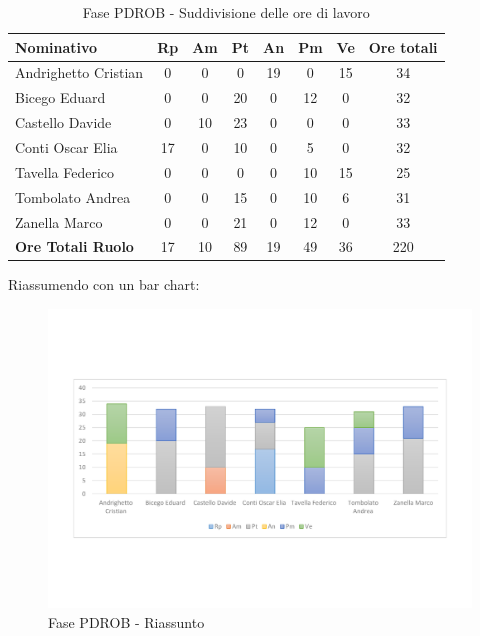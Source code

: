 \documentclass[../PianoProgetto.tex]{subfiles}
\begin{document}
	\begin{table}[h]
	
		\begin{tabularx}{\textwidth}{l  * {6}{C}  c}
			\toprule
			\textbf{Nominativo} & \textbf{Rp} & \textbf{Am} & \textbf{Pt} 
						& \textbf{An} & \textbf{Pm} & \textbf{Ve} & \textbf{Ore totali} \\
			\midrule
			Andrighetto Cristian & 0 &	0 &	0 &	19 & 0 & 15 & 34 \\
			Bicego Eduard & 0 &	0 &	20 & 0 & 12 & 0 & 32 \\
			Castello Davide & 0 & 10 & 23 &	0 &	0 &	0 &	33 \\
			Conti Oscar Elia & 17 &	0 &	10 & 0 & 5 & 0 & 32 \\
			Tavella Federico &	0 &	0 &	0 &	0 &	10 & 15 & 25 \\
			Tombolato Andrea & 0 & 0 &	15 & 0 & 10 & 6 & 31 \\
			Zanella Marco & 0 & 0 &	21 & 0 & 12 & 0 & 33 \\
			\midrule			
			\textbf{Ore Totali Ruolo} & 17 & 10 & 89 & 19 & 49 &	36 & 220 \\
			\bottomrule
		\end{tabularx}
		\caption{Fase PDROB - Suddivisione delle ore di lavoro}
		\label{tab:fasePDROB_ore}
	\end{table}
\vfill
\newpage
\vfill	
	Riassumendo con un bar chart:	
	
	\begin{figure}[!h]
		\centering
		\includegraphics[width=\textwidth , trim=2cm 5cm 2cm 5cm]{grafici/PDROB/PDROB-ore-persona}
			\caption{Fase PDROB - Riassunto}
		\label{fig:BarChart-fasePDROB_ore}
	\end{figure}
\vfill	
\end{document}
